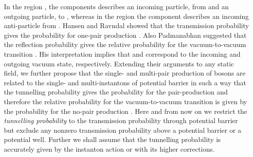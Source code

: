 \documentclass[a4paper,prd,showpacs,preprintnumbers,amsmath,amssymb]{revtex4}
\begin{document}
In the region \coordHE{}, the
components \coordHE{}
describes an incoming particle, from and \coordHE{} an outgoing particle, to \myHighlight{$\xi= -
\infty$}\coordHE{}, whereas in the region \coordHE{} the component \coordHE{} describes an incoming anti-particle from \myHighlight{$\xi =
+ \infty$}\coordHE{}.  Hansen and Ravndal showed that the transmission
probability \coordHE{} gives the probability for
one-pair production \cite{han}. Also Padmanabhan suggested that
the reflection probability \coordHE{} gives the relative
probability for the vacuum-to-vacuum transition \cite{pad,pad2}.
His interpretation implies that \coordHE{} and \coordHE{} correspond to the
incoming and outgoing vacuum state, respectively. Extending their
arguments to any static field, we further propose that the single-
and multi-pair production of bosons are related to the single- and
multi-instantons of potential barrier in such a way that the
tunnelling probability \coordHE{} gives the probability for the
pair-production and therefore the relative probability for the
vacuum-to-vacuum transition is given by the probability for the
no-pair production \coordHE{}. Here and from
now on we restrict the {\it tunnelling probability} to the
transmission probability through potential barrier but exclude any
nonzero transmission probability above a potential barrier or a
potential well. Further we shall assume that the tunnelling
probability is accurately given by the instanton action or with
its higher corrections.
\end{document}
